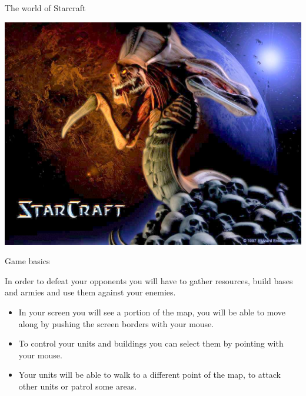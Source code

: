 \documentclass[10pt]{beamer}
\begin{document}
\begin{frame}{The world of Starcraft}

\begin{center}
	  \includegraphics[scale=0.3]{hydralisk.jpg}\end{center}

\end{frame}


\begin{frame}{Game basics}

In order to defeat your opponents you will have to gather resources, build bases and armies and use them against your enemies.

\begin{itemize}
     \item In your screen you will see a portion of the map, you will be able to move along by pushing the screen borders with your mouse.
     \item To control your units and buildings you can select them by pointing with your mouse.
     \item Your units will be able to walk to a different point of the map, to attack other units or patrol some areas.
    \end{itemize}

\end{frame}
\end{document}
